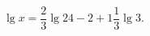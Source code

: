 \begin{ex}[type=equation]
	\begin{condition}
		$\lg x = \dfrac{2}{3}\lg 24 - 2 + 1\dfrac{1}{3}\lg 3.$
	\end{condition}
\end{ex}